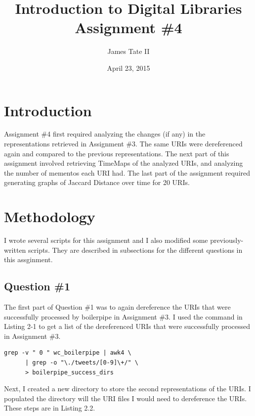\documentclass[a4paper,12pt]{article}
\begin{document}
\renewcommand{\thelstlisting}{\thesection.\arabic{lstlisting}}
\renewcommand{\thefigure}{\arabic{section}.\arabic{figure}}
\renewcommand{\thetable}{\arabic{section}.\arabic{table}}
\setlength{\floatsep}{0pt plus 2pt minus 2pt}

\title{Introduction to Digital Libraries Assignment \#4}
\date{April 23, 2015}
\author{James Tate II}
\maketitle

\section{Introduction}
Assignment \#4 first required analyzing the changes (if any) in the representations retrieved
in Assignment \#3. The same URIs were dereferenced again and compared to the previous
representations. The next part of this assignment involved retrieving TimeMaps of the
analyzed URIs, and analyzing the number of mementos each URI had. The last part of the
assignment required generating graphs of Jaccard Distance over time for 20 URIs.

\section{Methodology}
I wrote several scripts for this assignment and I also modified some previously-written
scripts. They are described in subsections for the different questions in this assginment.

\subsection{Question \#1}
The first part of Question \#1 was to again dereference the URIs that were successfully
processed by boilerpipe in Assignment \#3\cite{hw3}. I used the command in Listing 2-1 to
get a list of the dereferenced URIs that were successfully processed in Assignment \#3.

\begin{lstlisting}[basicstyle=\ttfamily,caption={Getting URIs that
Succeded Boilerpipe Processing }]
    grep -v " 0 " wc_boilerpipe | awk4 \
      | grep -o "\./tweets/[0-9]\+/" \
      > boilerpipe_success_dirs
\end{lstlisting}

Next, I created a new directory to store the second representations of the URIs. I populated
the directory will the URI files I would need to dereference the URIs. These steps are in
Listing 2.2.
\end{document}
